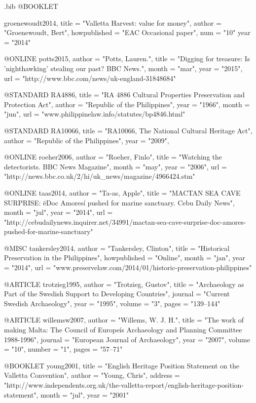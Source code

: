 \begin{filecontents}{\IJSRAidentifier.bib}
@BOOKLET {groenewoudt2014,
title        = "Valletta Harvest: value for money",
author       = "Groenewoudt, Bert",
howpublished = "EAC Occasional paper",
num          = "10"
year         = "2014"

}

@ONLINE {potts2015,
author = "Potts, Lauren.",
title  = "Digging for treasure: Is 'nighthawking' stealing our past? BBC News.",
month  = "mar",
year   = "2015",
url    = "http://www.bbc.com/news/uk-england-31848684"
}

@STANDARD {RA4886,
title  = "RA 4886 Cultural Properties Preservation and Protection Act",
author = "Republic of the Philippines",
year   = "1966",
month  = "jun",
url   = "www.philippinelaw.info/statutes/bp4846.html"
}

@STANDARD {RA10066,
title  = "RA10066, The National Cultural Heritage Act",
author = "Republic of the Philippines",
year   = "2009",
}

@ONLINE {roeher2006,
author = "Roeher, Finlo",
title  = "Watching the detectorists. BBC News Magazine",
month  = "may",
year   = "2006",
url    = "http://news.bbc.co.uk/2/hi/uk_news/magazine/4966424.stm"
}

@ONLINE {taas2014,
author = "Ta-as, Apple",
title  = "MACTAN SEA CAVE SURPRISE: ëDoc Amoresí pushed for marine sanctuary. Cebu Daily News",
month  = "jul",
year   = "2014",
url    = "http://cebudailynews.inquirer.net/34991/mactan-sea-cave-surprise-doc-amores-pushed-for-marine-sanctuary"
}

@MISC {tankersley2014,
author       = "Tankersley, Clinton",
title        = "Historical Preservation in the Philippines",
howpublished = "Online",
month        = "jan",
year         = "2014",
url         = "www.preservelaw.com/2014/01/historic-preservation-philippines"
}

@ARTICLE {trotzieg1995,
author  = "Trotzieg, Gustov",
title   = "Archaeology as Part of the Swedish Support to Developing Countries",
journal = "Current Swedish Archaeology",
year    = "1995",
volume  = "3",
pages   = "139--144"
}

@ARTICLE {willemsw2007,
author  = "Willems, W. J. H.",
title   = "The work of making Malta: The Council of Europeís Archaeology and Planning Committee 1988-1996",
journal = "European Journal of Archaeology",
year    = "2007",
volume  = "10",
number  = "1",
pages   = "57--71"
}

@BOOKLET {young2001,
title   = "English Heritage Position Statement on the Valletta Convention",
author  = "Young, Chris",
address = "http://www.independents.org.uk/the-valletta-report/english-heritage-position-statement",
month   = "jul",
year    = "2001"
}

\end{filecontents}

